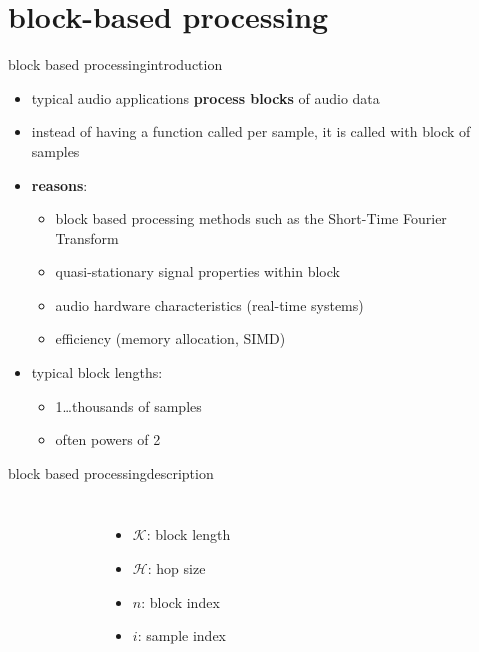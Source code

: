    \section[blocking]{block-based processing}
        \begin{frame}{block based processing}{introduction}
            \begin{itemize}
                \item   typical audio applications \textbf{process blocks} of audio data  
                \item   instead of having a function called per sample, it is called with block of samples
                \bigskip
                \item   \textbf{reasons}:
                    \begin{itemize}
                        \item   block based processing methods such as the Short-Time Fourier Transform
                        \item	quasi-stationary signal properties within block
                        \item	audio hardware characteristics (real-time systems)
                        \item	efficiency (memory allocation, SIMD)
                    \end{itemize}
                \smallskip
                \item<2->   typical block lengths:
                    \begin{itemize}
                        \item   1\ldots thousands of samples
                        \item   often powers of 2
                    \end{itemize}
            \end{itemize}
        \end{frame}
        \begin{frame}{block based processing}{description}
            \vspace{-4mm}
            \pause
            \begin{columns}
                    \vspace{-11mm}
                    \begin{figure}
                        \centering
                        	
                    \end{figure}
                    \begin{itemize}
                        \item   $\mathcal{K}$: block length
                        \item   $\mathcal{H}$: hop size
                        \item   $n$: block index
                        \item   $i$: sample index
                    \end{itemize}
            \end{columns}
        \end{frame}
